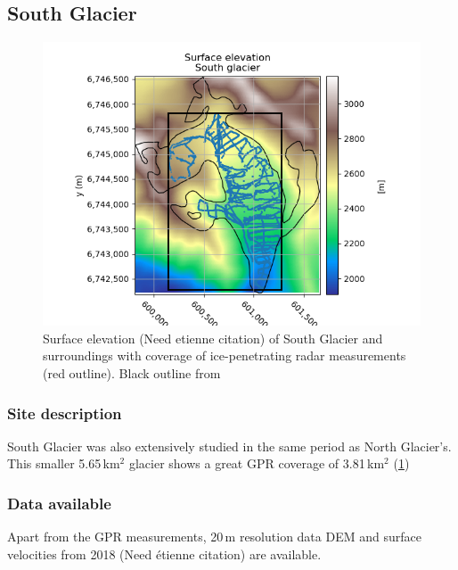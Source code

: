 \documentclass[a4, 12pt]{article}
\begin{document}
\subsection{South Glacier}

\begin{figure}[h!]
\centering
\includegraphics[scale=0.8]{../imgs/South glacier/elevation.png}
\caption{Surface elevation (Need etienne citation) of South Glacier and surroundings with coverage of ice-penetrating radar measurements (red outline). Black outline from \citet{pfeffer2014randolph}}
\label{fig:sg_dem}
\end{figure}

\subsubsection{Site description}
South Glacier was also extensively studied in the same period as North Glacier's. This smaller 5.65\,km$^2$ glacier shows a great GPR coverage of 3.81\,km$^2$ (\ref{fig:sg_dem})

\subsubsection{Data available}
Apart from the GPR measurements, 20\,m resolution data DEM and surface velocities from 2018 (Need étienne citation) are available.
\end{document}
